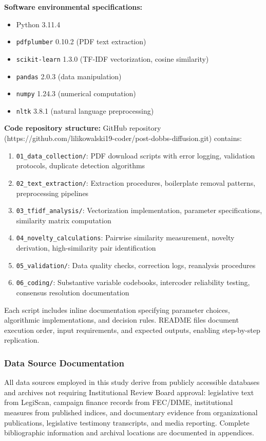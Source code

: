 \textbf{Software environmental specifications:}
\begin{itemize}
    \item Python 3.11.4
    \item \texttt{pdfplumber} 0.10.2 (PDF text extraction)
    \item \texttt{scikit-learn} 1.3.0 (TF-IDF vectorization, cosine similarity)
    \item \texttt{pandas} 2.0.3 (data manipulation)
    \item \texttt{numpy} 1.24.3 (numerical computation)
    \item \texttt{nltk} 3.8.1 (natural language preprocessing)
\end{itemize}

        \textbf{Code repository structure:} GitHub repository (https://github.com/lilikowalski19-coder/post-dobbs-diffusion.git) contains:
\begin{enumerate}
    \item \texttt{01\_data\_collection/}: PDF download scripts with error logging, validation protocols, duplicate detection algorithms
    \item \texttt{02\_text\_extraction/}: Extraction procedures, boilerplate removal patterns, preprocessing pipelines
    \item \texttt{03\_tfidf\_analysis/}: Vectorization implementation, parameter specifications, similarity matrix computation
    \item \texttt{04\_novelty\_calculations}: Pairwise similarity measurement, novelty derivation, high-similarity pair identification
    \item \texttt{05\_validation/}: Data quality checks, correction logs, reanalysis procedures
    \item \texttt{06\_coding/}: Substantive variable codebooks, intercoder reliability testing, consensus resolution documentation
\end{enumerate}

Each script includes inline documentation specifying parameter choices, algorithmic implementations, and decision rules. README files document execution order, input requirements, and expected outputs, enabling step-by-step replication.

\subsubsection{Data Source Documentation}

All data sources employed in this study derive from publicly accessible databases and archives not requiring Institutional Review Board approval: legislative text from LegiScan, campaign finance records from FEC/DIME, institutional measures from published indices, and documentary evidence from organizational publications, legislative testimony transcripts, and media reporting. Complete bibliographic information and archival locations are documented in appendices.


